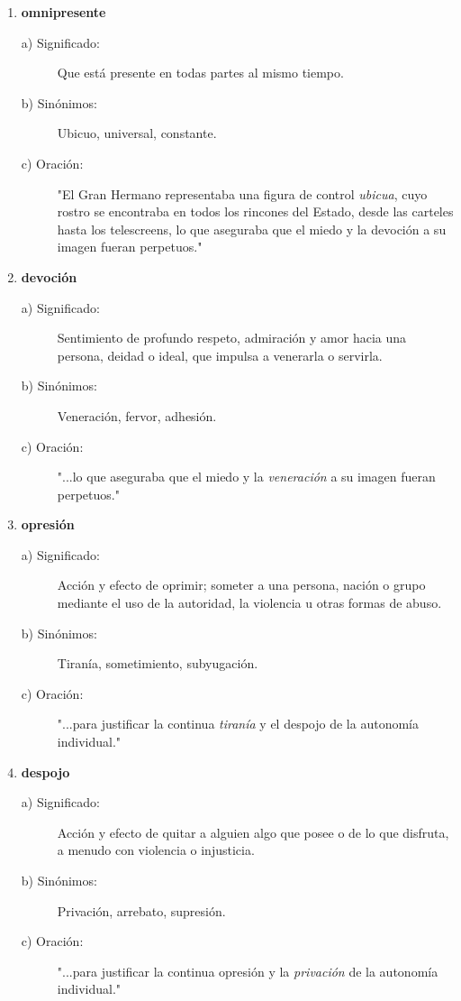 \documentclass[11pt, a4paper]{article}
\begin{document}
\begin{enumerate}
    \item \textbf{omnipresente}
    \begin{description}
        \item[a) Significado:] Que está presente en todas partes al mismo tiempo.
        \item[b) Sinónimos:] Ubicuo, universal, constante.
        \item[c) Oración:] "El Gran Hermano representaba una figura de control \textit{ubicua}, cuyo rostro se encontraba en todos los rincones del Estado, desde las carteles hasta los telescreens, lo que aseguraba que el miedo y la devoción a su imagen fueran perpetuos."
    \end{description}
    
    \item \textbf{devoción}
    \begin{description}
        \item[a) Significado:] Sentimiento de profundo respeto, admiración y amor hacia una persona, deidad o ideal, que impulsa a venerarla o servirla.
        \item[b) Sinónimos:] Veneración, fervor, adhesión.
        \item[c) Oración:] "...lo que aseguraba que el miedo y la \textit{veneración} a su imagen fueran perpetuos."
    \end{description}

    \item \textbf{opresión}
    \begin{description}
        \item[a) Significado:] Acción y efecto de oprimir; someter a una persona, nación o grupo mediante el uso de la autoridad, la violencia u otras formas de abuso.
        \item[b) Sinónimos:] Tiranía, sometimiento, subyugación.
        \item[c) Oración:] "...para justificar la continua \textit{tiranía} y el despojo de la autonomía individual."
    \end{description}
    
    \item \textbf{despojo}
    \begin{description}
        \item[a) Significado:] Acción y efecto de quitar a alguien algo que posee o de lo que disfruta, a menudo con violencia o injusticia.
        \item[b) Sinónimos:] Privación, arrebato, supresión.
        \item[c) Oración:] "...para justificar la continua opresión y la \textit{privación} de la autonomía individual."
    \end{description}


\end{enumerate}
\end{document}
